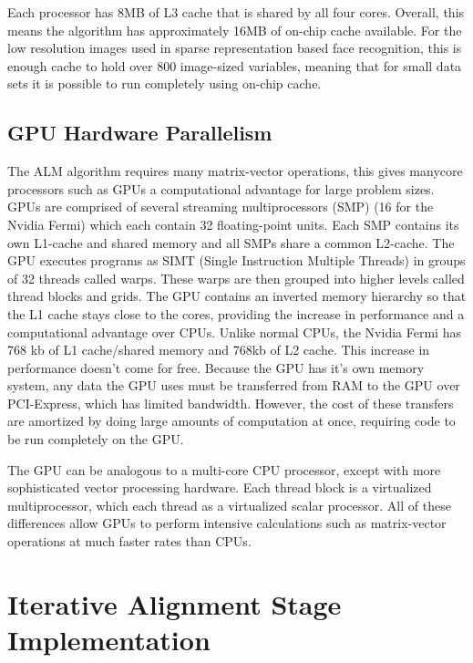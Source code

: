 \documentclass[10pt,twocolumn,letterpaper]{article}
\begin{document}
Each processor has 8MB of L3 cache that is shared by all four cores.  Overall,
this means the algorithm has approximately 16MB of on-chip cache available.
For the low resolution images used in sparse representation based face
recognition, this is enough cache to hold over 800 image-sized variables,
meaning that for small data sets it is possible to run completely using on-chip
cache.

\subsection{GPU Hardware Parallelism}

The ALM algorithm requires many matrix-vector operations, this gives manycore processors such as GPUs a computational advantage for large problem sizes.  GPUs are comprised of several streaming multiprocessors (SMP) (16 for the Nvidia Fermi) which each contain 32 floating-point units.  Each SMP contains its own L1-cache and shared memory and all SMPs share a common L2-cache.  The GPU executes programs as SIMT (Single Instruction Multiple Threads) in groups of 32 threads called warps.  These warps are then grouped into higher levels called thread blocks and grids. The GPU contains an inverted memory hierarchy so that the L1 cache stays close to the cores, providing the increase in performance and a computational advantage over CPUs.  Unlike normal CPUs, the Nvidia Fermi has 768 kb of L1 cache/shared memory and 768kb of L2 cache.  This increase in performance doesn't come for free.  Because the GPU has it's own memory system, any data the GPU uses must be transferred from RAM to the GPU over PCI-Express, which has limited bandwidth.  However, the cost of these transfers are amortized by doing large amounts of computation at once, requiring code to be run completely on the GPU.  

The GPU can be analogous to a multi-core CPU processor, except with more sophisticated vector processing hardware.  Each thread block is a virtualized multiprocessor, which each thread as a virtualized scalar processor.  All of these differences allow GPUs to perform intensive calculations such as matrix-vector operations at much faster rates than CPUs. 


\section{Iterative Alignment Stage Implementation}
\end{document}
